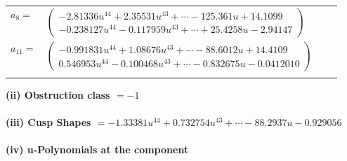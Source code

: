 \documentclass[1p]{elsarticle_modified}
\theoremstyle{definition}
\begin{document}
\begin{tabular}{m{7pt} m{180pt} m{7pt} m{180pt} }
\flushright $a_{8}=$&$\begin{pmatrix}-2.81336 u^{44}+2.35531 u^{43}+\cdots-125.361 u+14.1099\\-0.238127 u^{44}-0.117959 u^{43}+\cdots+25.4258 u-2.94147\end{pmatrix}$ \\
\flushright $a_{11}=$&$\begin{pmatrix}-0.991831 u^{44}+1.08676 u^{43}+\cdots-88.6012 u+14.4109\\0.546953 u^{44}-0.100468 u^{43}+\cdots-0.832675 u-0.0412010\end{pmatrix}$\\&\end{tabular}
\flushleft \textbf{(ii) Obstruction class $= -1$}\\~\\
\flushleft \textbf{(iii) Cusp Shapes $= -1.33381 u^{44}+0.732754 u^{43}+\cdots-88.2937 u-0.929056$}\\~\\
\newpage\renewcommand{\arraystretch}{1}
\flushleft \textbf{(iv) u-Polynomials at the component}\newline \\
\end{document}
